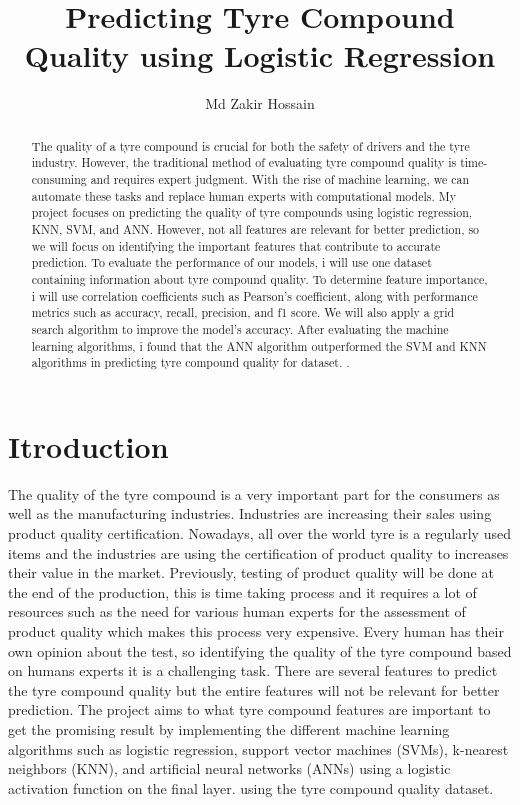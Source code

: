 \documentclass{article}
\title{Predicting Tyre Compound Quality using Logistic Regression}
\author{Md Zakir Hossain}
\begin{document}
\maketitle

\begin{abstract}
The quality of a tyre compound is crucial for both the safety of drivers and the tyre industry. However, the traditional method of evaluating tyre compound quality is time-consuming and requires expert judgment. With the rise of machine learning, we can automate these tasks and replace human experts with computational models.
My project focuses on predicting the quality of tyre compounds using logistic regression, KNN, SVM, and ANN. However, not all features are relevant for better prediction, so we will focus on identifying the important features that contribute to accurate prediction.
To evaluate the performance of our models, i will use one dataset containing information about tyre compound quality. To determine feature importance, i will use correlation coefficients such as Pearson's coefficient, along with performance metrics such as accuracy, recall, precision, and f1 score. We will also apply a grid search algorithm to improve the model's accuracy.
After evaluating the machine learning algorithms, i found that the ANN algorithm outperformed the SVM and KNN algorithms in predicting tyre compound quality for dataset.
.
\end{abstract}

\section{Itroduction}

The quality of the tyre compound is a very important part for the consumers as well as the manufacturing industries. Industries are increasing their sales using product quality certification. Nowadays, all over the world tyre is a regularly used items and the industries are using the certification of product quality to increases their value in the market. Previously, testing of product quality will be done at the end of the production, this is time taking process and it requires a lot of resources such as the need for various human experts for the assessment of product quality which makes this process very expensive. Every human has their own opinion about the test, so identifying the quality of the tyre compound  based on humans experts it is a challenging task. There are several features to predict the tyre compound quality but the entire features will not be relevant for better prediction. The project aims to what tyre compound features are important to get the promising result by implementing the different machine learning algorithms such as logistic regression, support vector machines (SVMs), k-nearest neighbors (KNN), and artificial neural networks (ANNs) using a logistic activation function on the final layer.
using the tyre compound quality dataset. 
\end{document}
